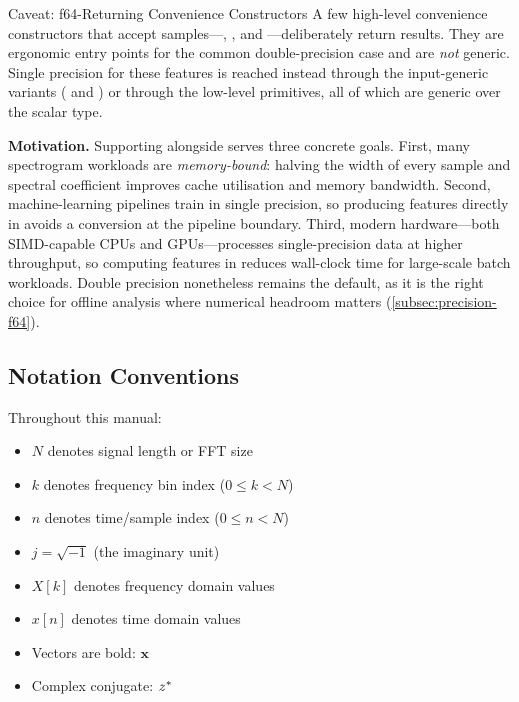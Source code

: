 \begin{concept}{Caveat: f64-Returning Convenience Constructors}
  A few high-level convenience constructors that accept 
  samples---, , and
  ---deliberately return  results.
  They are ergonomic entry points for the common double-precision case
  and are \emph{not} generic. Single precision for these features is
  reached instead through the input-generic variants
  ( and )
  or through the low-level primitives, all of which are generic over
  the scalar type.
\end{concept}

\textbf{Motivation.} Supporting  alongside  serves
three concrete goals. First, many spectrogram workloads are
\emph{memory-bound}: halving the width of every sample and spectral
coefficient improves cache utilisation and memory bandwidth. Second,
machine-learning pipelines train in single precision, so producing
features directly in  avoids a conversion at the
pipeline boundary. Third, modern hardware---both SIMD-capable CPUs and
GPUs---processes single-precision data at higher throughput, so
computing features in  reduces wall-clock time for large-scale
batch workloads. Double precision nonetheless remains the default, as it
is the right choice for offline analysis where numerical headroom
matters (\cref{subsec:precision-f64}).

\subsection{Notation Conventions}\label{subsec:notation}

Throughout this manual:
\begin{itemize}[itemsep=2pt]
  \item $N$ denotes signal length or FFT size
  \item $k$ denotes frequency bin index ($0 \leq k < N$)
  \item $n$ denotes time/sample index ($0 \leq n < N$)
  \item $j = \sqrt{-1}$ (the imaginary unit)
  \item $X[k]$ denotes frequency domain values
  \item $x[n]$ denotes time domain values
  \item Vectors are bold: $\mathbf{x}$
  \item Complex conjugate: $z^*$
\end{itemize}

